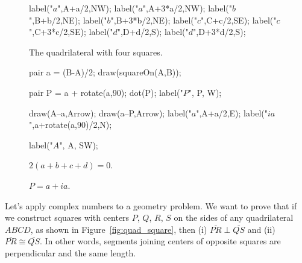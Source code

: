 \documentclass[../gatm.tex]{subfiles}
\begin{document}
\begin{figure}[h]
\begin{center}
\begin{minipage}[b]{0.35\textwidth}
\begin{center}
\begin{minipage}[b]{\textwidth}
\begin{asy}[width=0.6\textwidth]
						label("$a$",A+a/2,NW);
						label("$a$",A+3*a/2,NW);
						label("$b$",B+b/2,NE);
						label("$b$",B+3*b/2,NE);
						label("$c$",C+c/2,SE);
						label("$c$",C+3*c/2,SE);
						label("$d$",D+d/2,S);
						label("$d$",D+3*d/2,S);
						
					\end{asy}
				\end{minipage}
			\end{center}
			\vspace*{-2\baselineskip}
			\begin{center}
				\begin{minipage}[t]{\textwidth}
					\caption{The quadrilateral with four squares.}
					\label{fig:quad_square}
				\end{minipage}
			\end{center}
		
			\begin{center}
				\begin{minipage}[b]{\textwidth}
					\centering
					\begin{asy}[width=0.6\textwidth]
					
						pair a = (B-A)/2;
						draw(squareOn(A,B));
						
						pair P = a + rotate(a,90);
						dot(P);
						label("$P$", P, W);
						
						draw(A--a,Arrow);
						draw(a--P,Arrow);
						label("$a$",A+a/2,E);
						label("$ia$",a+rotate(a,90)/2,N);
						
						label("$A$", A, SW);
					\end{asy}
				\end{minipage}
			\end{center}
		\end{minipage}
	\end{center}
	\vspace*{-2\baselineskip}
	\begin{center}
		\begin{minipage}[t]{0.55\textwidth}
			\caption{$2(a+b+c+d)=0$.}
			\label{fig:add_to_0}
		\end{minipage}
		\hfill
		\begin{minipage}[t]{0.35\textwidth}
			\caption{$P=a+ia$.}
			\label{fig:p_def_on_a}
		\end{minipage}
	\end{center}
	\vspace*{-2\baselineskip}
\end{figure}


\noindent Let’s apply complex numbers to a geometry problem. We want to prove that if we construct squares with centers $P$, $Q$, $R$, $S$ on the sides of any quadrilateral $ABCD$, as shown in Figure~\ref{fig:quad_square}, then (i) $\overline{PR} \perp \overline{QS}$ and (ii) $\overline{PR} \cong \overline{QS}$. In other words, segments joining centers of opposite squares are perpendicular and the same length.
\end{document}
